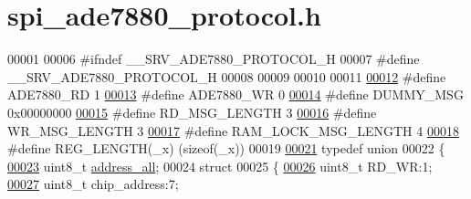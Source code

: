 \hypertarget{a00041}{\section{spi\-\_\-ade7880\-\_\-protocol.\-h}
\label{dd/d32/a00041}
}

\begin{DoxyCode}
00001 
00006 \textcolor{preprocessor}{#ifndef \_\_SRV\_ADE7880\_PROTOCOL\_H}
00007 \textcolor{preprocessor}{}\textcolor{preprocessor}{#define \_\_SRV\_ADE7880\_PROTOCOL\_H}
00008 \textcolor{preprocessor}{}
00009 
00010 
00011 
\hypertarget{a00041_source_l00012}{}\hyperlink{a00041_a30e8f63608e6153585d75dc479a03177}{00012} \textcolor{preprocessor}{#define ADE7880\_RD                  1}
\hypertarget{a00041_source_l00013}{}\hyperlink{a00041_a36352e0d88dc7c5ede031013c75a678f}{00013} \textcolor{preprocessor}{}\textcolor{preprocessor}{#define ADE7880\_WR                  0}
\hypertarget{a00041_source_l00014}{}\hyperlink{a00041_af87bc226c5bc1e648d8ceac69ccf2bcb}{00014} \textcolor{preprocessor}{}\textcolor{preprocessor}{#define DUMMY\_MSG                   0x00000000}
\hypertarget{a00041_source_l00015}{}\hyperlink{a00041_a0f0795755fb9e8e47c78c1289e091282}{00015} \textcolor{preprocessor}{}\textcolor{preprocessor}{#define RD\_MSG\_LENGTH               3            }
\hypertarget{a00041_source_l00016}{}\hyperlink{a00041_ac85ecf34a5cbd85d6dbd51b4c9a5469e}{00016} \textcolor{preprocessor}{}\textcolor{preprocessor}{#define WR\_MSG\_LENGTH               3       }
\hypertarget{a00041_source_l00017}{}\hyperlink{a00041_ab38a2f23d72262bab020eb973958f37b}{00017} \textcolor{preprocessor}{}\textcolor{preprocessor}{#define RAM\_LOCK\_MSG\_LENGTH         4   }
\hypertarget{a00041_source_l00018}{}\hyperlink{a00041_a4dc3b9b3e720309f9ebbb2d93768ed4f}{00018} \textcolor{preprocessor}{}\textcolor{preprocessor}{#define REG\_LENGTH(\_x)              (sizeof(\_x))}
00019 \textcolor{preprocessor}{}    
\hypertarget{a00041_source_l00021}{}\hyperlink{a00011}{00021} \textcolor{keyword}{typedef} \textcolor{keyword}{union}
00022 \{
\hypertarget{a00041_source_l00023}{}\hyperlink{a00011_a7bf6defa0ae3fb2bca057a3a97d4f740}{00023}     uint8\_t \hyperlink{a00011_a7bf6defa0ae3fb2bca057a3a97d4f740}{address\_all};
00024     \textcolor{keyword}{struct}
00025     \{
\hypertarget{a00041_source_l00026}{}\hyperlink{a00011_a97e2668c8e5470fa66185f16dc2e8045}{00026}         uint8\_t RD\_WR:1;
\hypertarget{a00041_source_l00027}{}\hyperlink{a00011_a935ee6f74a5c245878a724b16c4b06b7}{00027}         uint8\_t chip\_address:7;

\end{DoxyCode}
